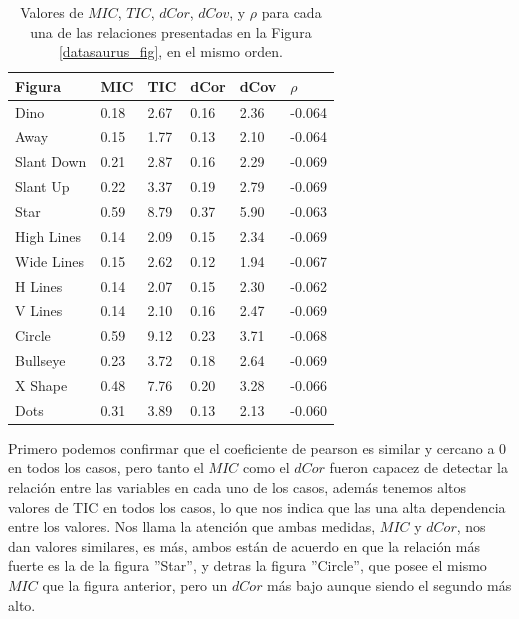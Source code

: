     \begin{table}
        \label{tab:datsaurus}
        \centering
        \begin{tabular}{|l|lllll|}\hline
        Figura     & MIC  & TIC  & dCor & dCov & $\rho $   \\\hline
        Dino       & 0.18 & 2.67 & 0.16 & 2.36 & -0.064 \\
        Away       & 0.15 & 1.77 & 0.13 & 2.10 & -0.064 \\
        Slant Down & 0.21 & 2.87 & 0.16 & 2.29 & -0.069 \\
        Slant Up   & 0.22 & 3.37 & 0.19 & 2.79 & -0.069 \\
        Star       & 0.59 & 8.79 & 0.37 & 5.90 & -0.063 \\
        High Lines & 0.14 & 2.09 & 0.15 & 2.34 & -0.069 \\
        Wide Lines & 0.15 & 2.62 & 0.12 & 1.94 & -0.067 \\
        H Lines    & 0.14 & 2.07 & 0.15 & 2.30 & -0.062 \\
        V Lines    & 0.14 & 2.10 & 0.16 & 2.47 & -0.069 \\
        Circle     & 0.59 & 9.12 & 0.23 & 3.71 & -0.068 \\
        Bullseye   & 0.23 & 3.72 & 0.18 & 2.64 & -0.069 \\
        X Shape    & 0.48 & 7.76 & 0.20 & 3.28 & -0.066 \\
        Dots       & 0.31 & 3.89 & 0.13 & 2.13 & -0.060 \\\hline
        \end{tabular}
        \caption{Valores de $MIC$, $TIC$, $dCor$, $dCov$, y $\rho$ para cada una de las relaciones presentadas en la Figura \ref{datasaurus_fig}, en el mismo orden.}
    \end{table}
        

        

    Primero podemos confirmar que el coeficiente de pearson es similar y cercano a 0 en todos los casos, pero tanto el $MIC$ como el $dCor$ fueron capacez de detectar la relaci\'on entre las variables en cada uno de los casos, adem\'as tenemos altos valores de TIC en todos los casos, lo que nos indica que las una alta dependencia entre los valores. Nos llama la atenci\'on que ambas medidas, $MIC$ y $dCor$, nos dan valores similares, es m\'as, ambos est\'an de acuerdo en que la relaci\'on m\'as fuerte es la de la figura ''Star'', y detras la figura ''Circle'', que posee el mismo $MIC$ que la figura anterior, pero un $dCor$ m\'as bajo aunque siendo el segundo m\'as alto. 